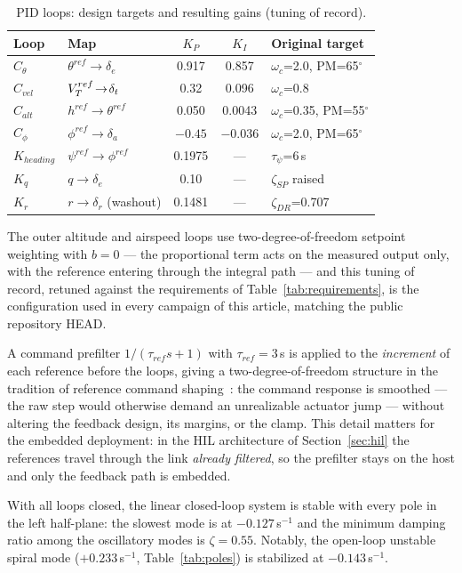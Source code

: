 \begin{table}[!t]
\caption{PID loops: design targets and resulting gains (tuning of
record).}
\label{tab:gains}
\centering
\begin{tabular}{llccl}
\toprule
Loop & Map & $K_P$ & $K_I$ & Original target \\
\midrule
$C_\theta$ & $\theta^{ref}\!\to\!\delta_e$ & 0.917 & 0.857 & $\omega_c$=2.0, PM=65$^\circ$ \\
$C_{vel}$ & $V_T^{ref}\!\to\!\delta_t$ & 0.32 & 0.096 & $\omega_c$=0.8 \\
$C_{alt}$ & $h^{ref}\!\to\!\theta^{ref}$ & 0.050 & 0.0043 & $\omega_c$=0.35, PM=55$^\circ$ \\
$C_\phi$ & $\phi^{ref}\!\to\!\delta_a$ & $-0.45$ & $-0.036$ & $\omega_c$=2.0, PM=65$^\circ$ \\
$K_{heading}$ & $\psi^{ref}\!\to\!\phi^{ref}$ & 0.1975 & --- & $\tau_\psi$=6\,s \\
$K_q$ & $q\!\to\!\delta_e$ & 0.10 & --- & $\zeta_{SP}$ raised \\
$K_r$ & $r\!\to\!\delta_r$ (washout) & 0.1481 & --- & $\zeta_{DR}$=0.707 \\
\bottomrule
\end{tabular}
\end{table}

The outer altitude and airspeed loops use two-degree-of-freedom
setpoint weighting with $b=0$ --- the proportional term acts on the
measured output only, with the reference entering through the integral
path --- and this tuning of record, retuned against the requirements
of Table~\ref{tab:requirements}, is the configuration used in every
campaign of this article, matching the public repository HEAD.

A command prefilter $1/(\tau_{ref}s+1)$ with $\tau_{ref}=3$\,s is applied
to the \emph{increment} of each reference before the loops, giving a
two-degree-of-freedom structure in the tradition of reference command
shaping~\cite{singer1990preshaping}: the command response is smoothed
--- the raw step would otherwise demand an unrealizable actuator jump
--- without altering the feedback design, its margins, or the clamp. This detail
matters for the embedded deployment: in the HIL architecture of
Section~\ref{sec:hil} the references travel through the link
\emph{already filtered}, so the prefilter stays on the host and only the
feedback path is embedded.

With all loops closed, the linear closed-loop system is stable with every
pole in the left half-plane: the slowest mode is at $-0.127$\,s$^{-1}$ and
the minimum damping ratio among the oscillatory modes is $\zeta=0.55$.
Notably, the open-loop unstable spiral mode ($+0.233$\,s$^{-1}$,
Table~\ref{tab:poles}) is stabilized at $-0.143$\,s$^{-1}$.

